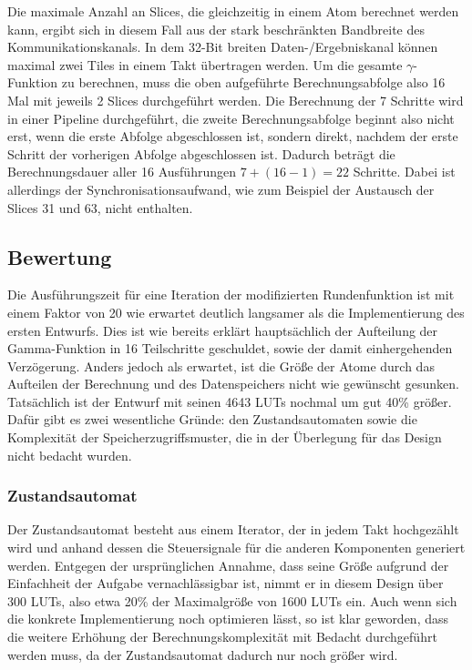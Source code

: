 Die maximale Anzahl an Slices, die gleichzeitig in einem Atom berechnet werden kann, ergibt sich in diesem Fall aus der stark beschränkten Bandbreite
des Kommunikationskanals. In dem 32-Bit breiten Daten-/Ergebniskanal können maximal zwei Tiles in einem Takt übertragen werden.
Um die gesamte $\gamma$-Funktion zu berechnen, muss die oben aufgeführte Berechnungsabfolge also 16 Mal mit jeweils 2 Slices durchgeführt werden.
Die Berechnung der 7 Schritte wird in einer Pipeline durchgeführt, die zweite Berechnungsabfolge beginnt also nicht erst, wenn die erste Abfolge abgeschlossen ist,
sondern direkt, nachdem der erste Schritt der vorherigen Abfolge abgeschlossen ist. Dadurch beträgt die Berechnungsdauer aller 16 Ausführungen
$7 + (16 - 1) = 22$ Schritte. Dabei ist allerdings der Synchronisationsaufwand, wie zum Beispiel der Austausch der Slices 31 und 63, nicht enthalten.

\subsection{Bewertung}
Die Ausführungszeit für eine Iteration der modifizierten Rundenfunktion ist mit einem Faktor von 20 wie erwartet deutlich langsamer als die Implementierung des ersten Entwurfs.
Dies ist wie bereits erklärt hauptsächlich der Aufteilung der Gamma-Funktion in 16 Teilschritte geschuldet, sowie der damit einhergehenden Verzögerung.
Anders jedoch als erwartet, ist die Größe der Atome durch das Aufteilen der Berechnung und des Datenspeichers nicht wie gewünscht gesunken.
Tatsächlich ist der Entwurf mit seinen 4643 LUTs nochmal um gut 40\% größer. Dafür gibt es zwei wesentliche Gründe: den Zustandsautomaten
sowie die Komplexität der Speicherzugriffsmuster, die in der Überlegung für das Design nicht bedacht wurden.

\subsubsection{Zustandsautomat}
Der Zustandsautomat besteht aus einem Iterator, der in jedem Takt hochgezählt wird und anhand dessen die Steuersignale für die anderen Komponenten generiert werden.
Entgegen der ursprünglichen Annahme, dass seine Größe aufgrund der Einfachheit der Aufgabe vernachlässigbar ist, nimmt er in diesem Design über 300 LUTs,
also etwa 20\% der Maximalgröße von 1600 LUTs ein. Auch wenn sich die konkrete Implementierung noch optimieren lässt, so ist klar geworden,
dass die weitere Erhöhung der Berechnungskomplexität mit Bedacht durchgeführt werden muss, da der Zustandsautomat dadurch nur noch größer wird.

